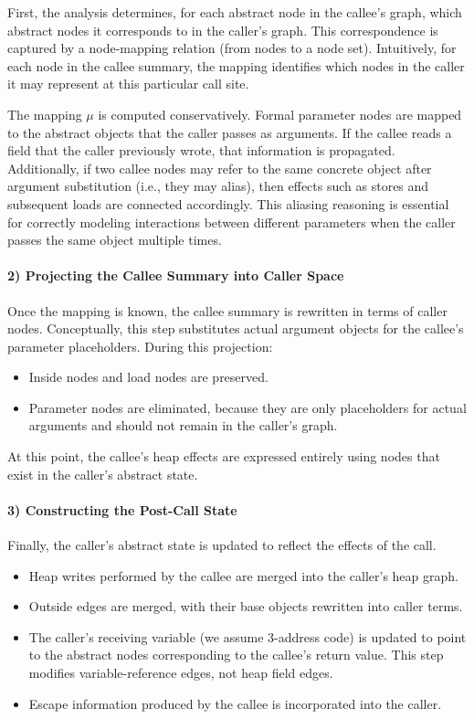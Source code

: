 \documentclass{article}
\begin{document}
First, the analysis determines, for each abstract node in the callee's graph, which abstract nodes it corresponds to in the caller's graph.
This correspondence is captured by a node-mapping relation (from nodes to a node set). 
Intuitively, for each node in the callee summary, the mapping identifies which nodes in the caller it may represent at this particular call site.

The mapping $\mu$ is computed conservatively. 
Formal parameter nodes are mapped to the abstract objects that the caller passes as arguments. 
If the callee reads a field that the caller previously wrote, that information is propagated.
Additionally, if two callee nodes may refer to the same concrete object after argument substitution (i.e., they may alias), then effects such as stores and subsequent loads are connected accordingly. This aliasing reasoning is essential for correctly modeling interactions between different parameters when the caller passes the same object multiple times.

\paragraph{2) Projecting the Callee Summary into Caller Space}

Once the mapping is known, the callee summary is rewritten in terms of caller nodes. 
Conceptually, this step substitutes actual argument objects for the callee’s parameter placeholders. During this projection:
\begin{itemize}
    \item Inside nodes and load nodes are preserved.
    \item Parameter nodes are eliminated, because they are only placeholders for actual arguments and should not remain in the caller’s graph.
\end{itemize}

\noindent At this point, the callee’s heap effects are expressed entirely using nodes that exist in the caller’s abstract state.

\paragraph{3) Constructing the Post-Call State}

Finally, the caller’s abstract state is updated to reflect the effects of the call.

\begin{itemize}
    \item Heap writes performed by the callee are merged into the caller’s heap graph.
    \item Outside edges are merged, with their base objects rewritten into caller terms.
    \item The caller’s receiving variable (we assume 3-address code) is updated to point to the abstract nodes corresponding to the callee’s return value. 
    This step modifies variable-reference edges, not heap field edges.
    \item Escape information produced by the callee is incorporated into the caller.
\end{itemize}
\end{document}

